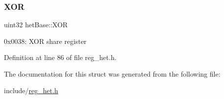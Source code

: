 \subsubsection{\texorpdfstring{X\+OR}{XOR}}
{\footnotesize\ttfamily uint32 het\+Base\+::\+X\+OR}

0x0038\+: X\+OR share register 

Definition at line 86 of file reg\+\_\+het.\+h.



The documentation for this struct was generated from the following file\+:\begin{DoxyCompactItemize}
\item 
include/\mbox{\hyperlink{reg__het_8h}{reg\+\_\+het.\+h}}\end{DoxyCompactItemize}
